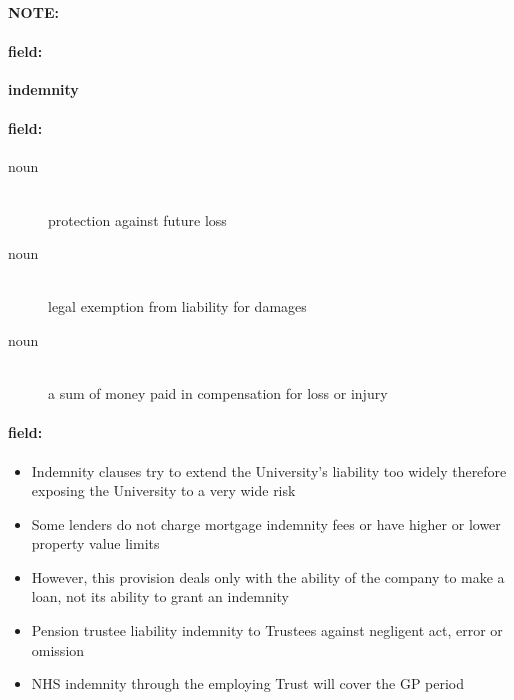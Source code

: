 \documentclass[12pt]{article}
\newenvironment{note}{\paragraph{NOTE:}}{}
\newenvironment{field}{\paragraph{field:}}{}
\begin{document}
\begin{note}
\begin{field}
\textbf{\large indemnity}
\end{field}


\begin{field}
\begin{description}
\item[noun] \hfill \\ 
protection against future loss

\item[noun] \hfill \\ 
legal exemption from liability for damages

\item[noun] \hfill \\ 
a sum of money paid in compensation for loss or injury

\end{description}
\end{field}

\begin{field}
\begin{itemize}
\item Indemnity clauses try to extend the University's liability too widely therefore exposing the University to a very wide risk
\item Some lenders do not charge mortgage indemnity fees or have higher or lower property value limits
\item However, this provision deals only with the ability of the company to make a loan, not its ability to grant an indemnity
\item Pension trustee liability indemnity to Trustees against negligent act, error or omission
\item NHS indemnity through the employing Trust will cover the GP period
\end{itemize}
\end{field}
\end{note}
\end{document}
